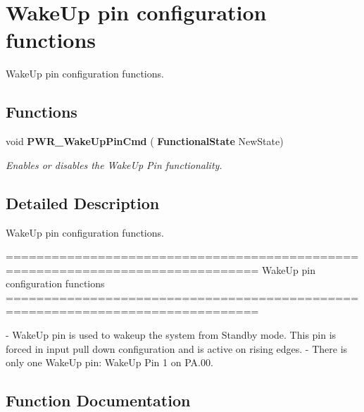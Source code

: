 \section{Wake\+Up pin configuration functions}
\label{group__PWR__Group3}


Wake\+Up pin configuration functions.  


\subsection*{Functions}
\begin{DoxyCompactItemize}
\item 
void \textbf{ P\+W\+R\+\_\+\+Wake\+Up\+Pin\+Cmd} (\textbf{ Functional\+State} New\+State)
\begin{DoxyCompactList}\small\item\em Enables or disables the Wake\+Up Pin functionality. \end{DoxyCompactList}\end{DoxyCompactItemize}


\subsection{Detailed Description}
Wake\+Up pin configuration functions. 

\begin{DoxyVerb} ===============================================================================
                    WakeUp pin configuration functions
 ===============================================================================  

 - WakeUp pin is used to wakeup the system from Standby mode. This pin is 
   forced in input pull down configuration and is active on rising edges.
 - There is only one WakeUp pin: WakeUp Pin 1 on PA.00.\end{DoxyVerb}
 

\subsection{Function Documentation}
\mbox{\label{group__PWR__Group3_gae5fd6f9336ef8c60d5483651cb0d1a00}} 
